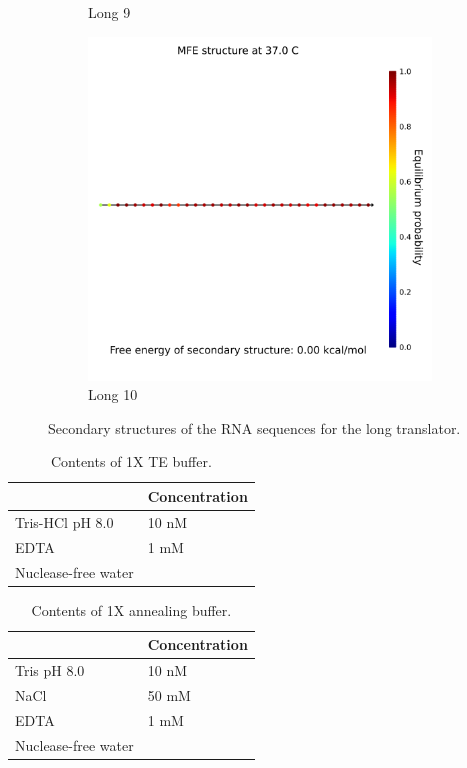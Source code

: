 \begin{figure}
\begin{subfigure}{.32\columnwidth}
  \caption{Long 9}
\end{subfigure}
\begin{subfigure}{.32\columnwidth}
  \centering
  \includegraphics[width=\linewidth]{images/long_rna_secondarystructure_10.png}
  \caption{Long 10}
\end{subfigure}
\caption{Secondary structures of the RNA sequences for the long translator.}
\label{long_secondary_structures}
\end{figure}

\begin{table}
\centering
\begin{tabular}{ll}
  \hline
\textbf{}           & \textbf{Concentration} \\
\hline
Tris-HCl pH 8.0     & 10 nM                  \\
EDTA                & 1 mM                   \\
Nuclease-free water &               \\
\hline
\end{tabular}
\caption{Contents of 1X TE buffer.}
\label{te_buffer}
\end{table}

\begin{table}
\centering
\begin{tabular}{ll}
  \hline
\textbf{}           & \textbf{Concentration} \\
\hline
Tris pH 8.0     & 10 nM                  \\
NaCl                & 50 mM                   \\
EDTA                & 1 mM                   \\
Nuclease-free water &               \\
\hline
\end{tabular}
\caption{Contents of 1X annealing buffer.}
\label{annealing_buffer}
\end{table}

